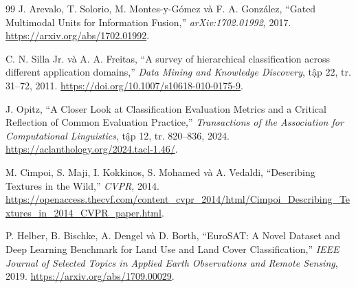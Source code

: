 \documentclass[12pt,a4paper]{article}
\numberwithin{figure}{section}
\numberwithin{table}{section}
\numberwithin{equation}{section}
\begin{document}
\begin{thebibliography}{99}
J. Arevalo, T. Solorio, M. Montes-y-Gómez và F. A. González, ``Gated Multimodal Units for Information Fusion,'' \textit{arXiv:1702.01992}, 2017.
\url{https://arxiv.org/abs/1702.01992}.

C. N. Silla Jr. và A. A. Freitas, ``A survey of hierarchical classification across different application domains,'' \textit{Data Mining and Knowledge Discovery}, tập 22, tr. 31--72, 2011.
\url{https://doi.org/10.1007/s10618-010-0175-9}.

J. Opitz, ``A Closer Look at Classification Evaluation Metrics and a Critical Reflection of Common Evaluation Practice,'' \textit{Transactions of the Association for Computational Linguistics}, tập 12, tr. 820--836, 2024.
\url{https://aclanthology.org/2024.tacl-1.46/}.

M. Cimpoi, S. Maji, I. Kokkinos, S. Mohamed và A. Vedaldi, ``Describing Textures in the Wild,'' \textit{CVPR}, 2014.
\url{https://openaccess.thecvf.com/content_cvpr_2014/html/Cimpoi_Describing_Textures_in_2014_CVPR_paper.html}.

P. Helber, B. Bischke, A. Dengel và D. Borth, ``EuroSAT: A Novel Dataset and Deep Learning Benchmark for Land Use and Land Cover Classification,'' \textit{IEEE Journal of Selected Topics in Applied Earth Observations and Remote Sensing}, 2019.
\url{https://arxiv.org/abs/1709.00029}.
\end{thebibliography}
\endgroup

\end{document}
